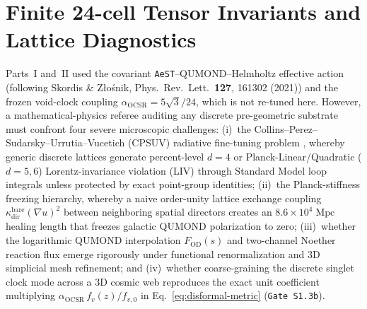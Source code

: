 \documentclass[11pt,a4paper]{article}
\begin{document}
\section{Finite 24-cell Tensor Invariants and Lattice Diagnostics}
\label{sec:step3-isotropy}
Parts~I and~II used the covariant \texttt{AeST}--QUMOND--Helmholtz effective action (following Skordis \& Z{\l}o{\'s}nik, Phys.\ Rev.\ Lett.\ \textbf{127}, 161302 (2021)) and the frozen void-clock coupling $\alpha_{\mathrm{OCSR}} = 5\sqrt{3}/24$, which is not re-tuned here. However, a mathematical-physics referee auditing any discrete pre-geometric substrate must confront four severe microscopic challenges:
(i)~the Collins--Perez--Sudarsky--Urrutia--Vucetich (CPSUV) radiative fine-tuning problem \cite{Collins2004}, whereby generic discrete lattices generate percent-level $d = 4$ or Planck-Linear/Quadratic ($d = 5, 6$) Lorentz-invariance violation (LIV) through Standard Model loop integrals unless protected by exact point-group identities;
(ii)~the Planck-stiffness freezing hierarchy, whereby a naive order-unity lattice exchange coupling $\kappa_{\mathrm{dir}}^{\mathrm{bare}}(\nabla u)^2$ between neighboring spatial directors creates an $8.6\times 10^4\;\mathrm{Mpc}$ healing length that freezes galactic QUMOND polarization to zero;
(iii)~whether the logarithmic QUMOND interpolation $F_{\mathrm{OD}}(s)$ and two-channel Noether reaction flux emerge rigorously under functional renormalization and 3D simplicial mesh refinement; and
(iv)~whether coarse-graining the discrete singlet clock mode across a 3D cosmic web reproduces the exact unit coefficient multiplying $\alpha_{\mathrm{OCSR}}\,f_v(z)/f_{v,0}$ in Eq.~\eqref{eq:disformal-metric} (\texttt{Gate S1.3b}).
\end{document}
